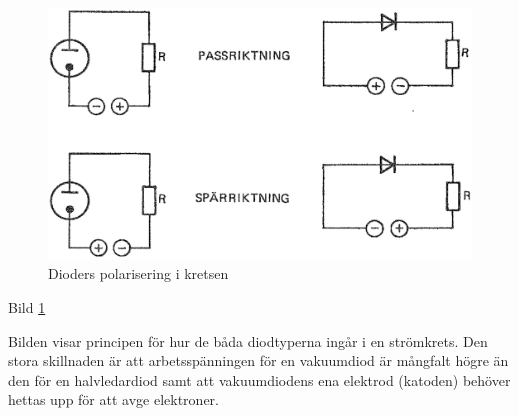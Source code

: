 \begin{figure}
\includegraphics[width=\textwidth]{images/cropped_pdfs/bild_2_2-15.pdf}
\caption{Dioders polarisering i kretsen}
\label{fig:BildII2-15}
\end{figure}

Bild \ref{fig:BildII2-15}

Bilden visar principen för hur de båda diodtyperna ingår i en strömkrets. Den
stora skillnaden är att arbetsspänningen för en vakuumdiod är mångfalt högre än
den för en halvledardiod samt att vakuumdiodens ena elektrod (katoden) behöver
hettas upp för att avge elektroner.
